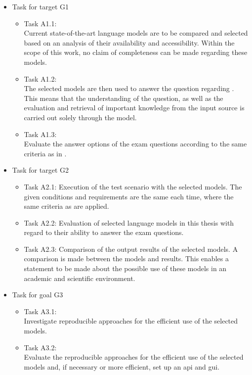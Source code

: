 \begin{itemize}
  \item Task for target G1
        \begin{itemize}
        \item Task A1.1:\\
          Current state-of-the-art language models are to be compared and selected based on an analysis of their availability and accessibility. Within the scope of this work, no claim of completeness can be made regarding these models.
        \item Task A1.2:\\
        The selected models are then used to answer the question regarding \citet{bb2}. 
        This means that the understanding of the question, as well as the evaluation and retrieval of important knowledge from the input source \citet{bb2} is carried out solely through the model.
        \item Task A1.3:\\
        Evaluate the answer options of the exam questions according to the same criteria as in \citet{Paul_Keller}.
          \end{itemize}
 \item Task for target G2
    \begin{itemize}
          \item Task A2.1: Execution of the test scenario with the selected models. 
          The given conditions and requirements are the same each time, where the same criteria as \citet{Paul_Keller} are applied.
          \item Task A2.2: Evaluation of selected language models in this thesis with regard to their ability to answer the exam questions.
          \item Task A2.3:
          Comparison of the output results of the selected models. 
          A comparison is made between the models and \citet{Paul_Keller} results.
          This enables a statement to be made about the possible use of these models in an academic and scientific environment.
        \end{itemize}
  \item Task for goal G3
        \begin{itemize}
          \item Task A3.1:\\Investigate reproducible approaches for the efficient use of the selected models.
          \item Task A3.2:\\Evaluate the reproducible approaches for the efficient use of the selected models and, if necessary or more efficient, set up an \ac{api} and \ac{gui}.
        \end{itemize}
\end{itemize}


